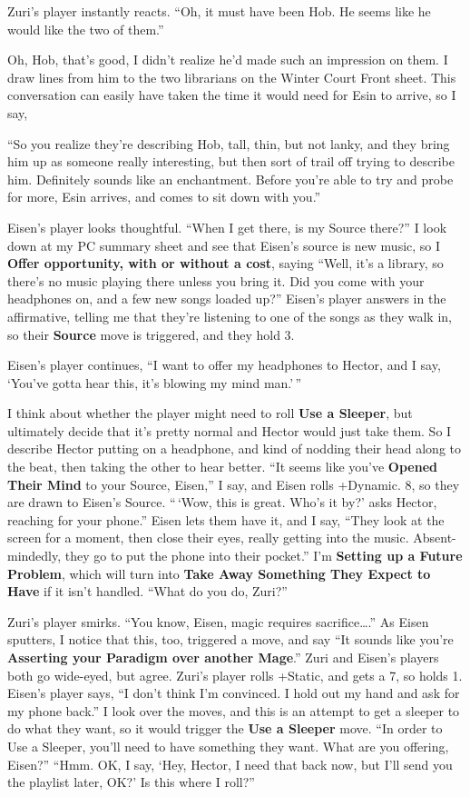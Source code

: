 \documentclass[
  oneside,
  statementpaper,
  9pt]{memoir}
\begin{document}
Zuri's player instantly reacts. ``Oh, it must have been Hob. He seems
like he would like the two of them.''

Oh, Hob, that's good, I didn't realize he'd made such an impression on
them. I draw lines from him to the two librarians on the Winter Court
Front sheet. This conversation can easily have taken the time it would
need for Esin to arrive, so I say,

``So you realize they're describing Hob, tall, thin, but not lanky, and
they bring him up as someone really interesting, but then sort of trail
off trying to describe him. Definitely sounds like an enchantment.
Before you're able to try and probe for more, Esin arrives, and comes to
sit down with you.''

Eisen's player looks thoughtful. ``When I get there, is my Source
there?'' I look down at my PC summary sheet and see that Eisen's source
is new music, so I \textbf{Offer opportunity, with or without a cost},
saying ``Well, it's a library, so there's no music playing there unless
you bring it. Did you come with your headphones on, and a few new songs
loaded up?'' Eisen's player answers in the affirmative, telling me that
they're listening to one of the songs as they walk in, so their
\textbf{Source} move is triggered, and they hold 3.

Eisen's player continues, ``I want to offer my headphones to Hector, and
I say, `You've gotta hear this, it's blowing my mind man.'\,''

I think about whether the player might need to roll \textbf{Use a
Sleeper}, but ultimately decide that it's pretty normal and Hector would
just take them. So I describe Hector putting on a headphone, and kind of
nodding their head along to the beat, then taking the other to hear
better. ``It seems like you've \textbf{Opened Their Mind} to your
Source, Eisen,'' I say, and Eisen rolls +Dynamic. 8, so they are drawn
to Eisen's Source. ``\,`Wow, this is great. Who's it by?' asks Hector,
reaching for your phone.'' Eisen lets them have it, and I say, ``They
look at the screen for a moment, then close their eyes, really getting
into the music. Absent-mindedly, they go to put the phone into their
pocket.'' I'm \textbf{Setting up a Future Problem}, which will turn into
\textbf{Take Away Something They Expect to Have} if it isn't handled.
``What do you do, Zuri?''

Zuri's player smirks. ``You know, Eisen, magic requires
sacrifice\ldots.'' As Eisen sputters, I notice that this, too, triggered
a move, and say ``It sounds like you're \textbf{Asserting your Paradigm
over another Mage}.'' Zuri and Eisen's players both go wide-eyed, but
agree. Zuri's player rolls +Static, and gets a 7, so holds 1. Eisen's
player says, ``I don't think I'm convinced. I hold out my hand and ask
for my phone back.'' I look over the moves, and this is an attempt to
get a sleeper to do what they want, so it would trigger the \textbf{Use
a Sleeper} move. ``In order to Use a Sleeper, you'll need to have
something they want. What are you offering, Eisen?'' ``Hmm. OK, I say,
`Hey, Hector, I need that back now, but I'll send you the playlist
later, OK?' Is this where I roll?''
\end{document}
